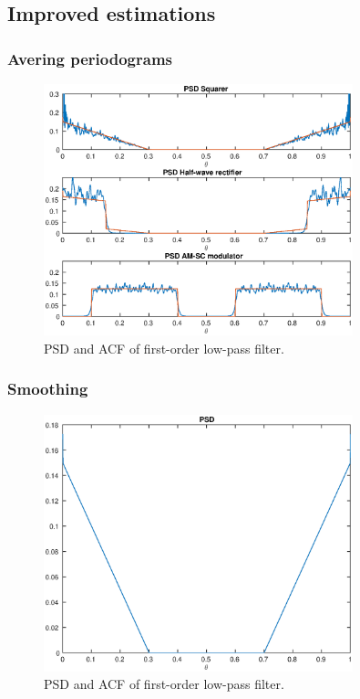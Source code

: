 \documentclass[a4paper,12pt]{article}
\begin{document}

\subsection{Improved estimations}


\subsubsection{Avering periodograms}
\begin{figure}[h]
\centering
\includegraphics[width=0.8\textwidth]{bilder/Lab2/Lab2fig8.eps}
\caption{PSD and ACF of first-order low-pass filter.}
\label{fig:Lab1fig1}
\end{figure}

\subsubsection{Smoothing}
\begin{figure}[h]
\centering
\includegraphics[width=0.8\textwidth]{bilder/Lab2/Lab2fig1.eps}
\caption{PSD and ACF of first-order low-pass filter.}
\label{fig:Lab1fig1}
\end{figure}
\end{document}
